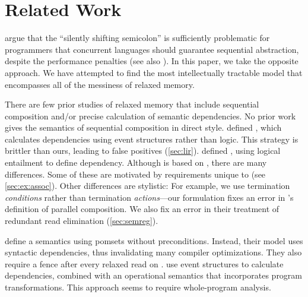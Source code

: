 \section{Related Work}
\label{sec:related}

\citet{DBLP:conf/snapl/MarinoMMNS15} argue that the ``silently shifting
semicolon'' is sufficiently problematic for programmers that concurrent
languages should guarantee sequential abstraction, despite the performance
penalties (see also \citet{10.1145/3462206}).  In this paper, we take the
opposite approach.  We have attempted to find the most intellectually
tractable model that encompasses all of the messiness of relaxed memory.

There are few prior studies of relaxed memory that include sequential
composition and/or precise calculation of semantic dependencies.  No prior
work gives the semantics of sequential composition in direct style.
\citet{DBLP:conf/esop/PaviottiCPWOB20} defined \MRD{}, which calculates
dependencies using event structures rather than logic.  This strategy is
brittler than ours, leading to false positives (\textsection\ref{sec:lir}).
\citet{DBLP:journals/pacmpl/JagadeesanJR20} defined \PwP{}, using logical
entailment to define dependency.  Although \PwT{} is based on \PwP{}, there
are many differences.
Some of these are motivated by requirements unique to
\PwT{} (see \textsection\ref{sec:ex:assoc}).
Other differences are stylistic: For
example, we use termination \emph{conditions} rather than termination
\emph{actions}---our formulation fixes an error in
\citeauthor{DBLP:journals/pacmpl/JagadeesanJR20}'s definition of parallel
composition.  We also fix an error in their treatment of redundant read
elimination (\textsection\ref{sec:semreg}).

\citet{DBLP:journals/corr/abs-1804-04214} define a semantics
using pomsets without preconditions. Instead, their model uses syntactic
dependencies, thus invalidating many compiler optimizations.  They also
require a fence after every relaxed read on \armeight{}.
%
\citet{Pichon-Pharabod:2016:CSR:2837614.2837616} use event structures to
calculate dependencies, combined with an operational semantics that
incorporates program transformations.  This approach seems to require
whole-program analysis.




